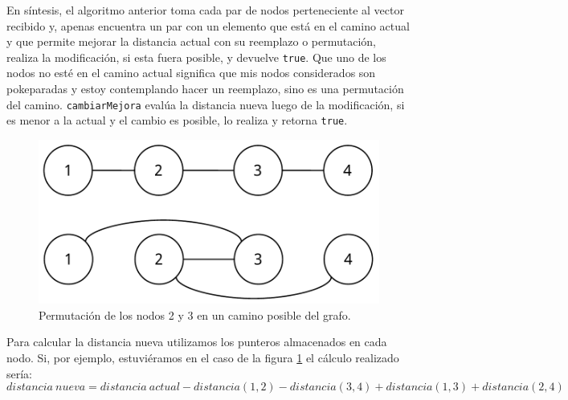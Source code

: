 En s\'intesis, el algoritmo anterior toma cada par de nodos perteneciente al vector recibido y, apenas encuentra un par con un elemento que est\'a en el camino actual y que permite mejorar la distancia actual con su reemplazo o permutaci\'on, realiza la modificaci\'on, si esta fuera posible, y devuelve \texttt{true}. Que uno de los nodos no est\'e en el camino actual significa que mis nodos considerados son pokeparadas y estoy contemplando hacer un reemplazo, sino es una permutaci\'on del camino. \texttt{cambiarMejora} eval\'ua la distancia nueva luego de la modificaci\'on, si es menor a la actual y el cambio es posible, lo realiza y retorna \texttt{true}.

\begin{figure}[H]
  \begin{center}
    \includegraphics[scale = 0.5]{imagenes/ej3_algoritmo_1.pdf}
    \caption{Permutaci\'on de los nodos 2 y 3 en un camino posible del grafo.}
    \label{fig:ej3_algoritmo_1}
  \end{center}
\end{figure}

Para calcular la distancia nueva utilizamos los punteros almacenados en cada nodo. Si, por ejemplo, estuvi\'eramos en el caso de la figura \ref{fig:ej3_algoritmo_1} el c\'alculo realizado ser\'ia:
\begin{equation*}
    distancia\ nueva = distancia\ actual - distancia(1,2) - distancia(3,4) + distancia(1,3) + distancia(2,4)
\end{equation*}


